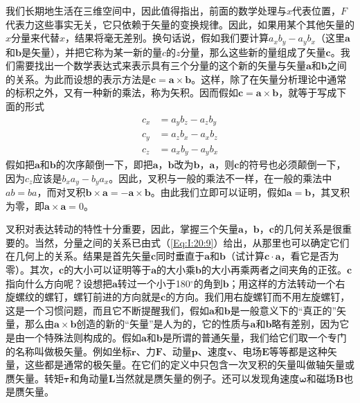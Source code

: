 我们长期地生活在三维空间中，因此值得指出，前面的数学处理与$x$代表位置，$F$代表力这些事实无关，它只依赖于矢量的变换规律。因此，如果用某个其他矢量的$x$分量来代替$x$，结果将毫无差别。换句话说，假如我们要计算$a_xb_y-a_yb_x$（这里$\boldsymbol{a}$和$\boldsymbol{b}$是矢量），并把它称为某一新的量$c$的$z$分量，那么这些新的量组成了矢量$\boldsymbol{c}$。我们需要找出一个数学表达式来表示具有三个分量的这个新的矢量与矢量$\boldsymbol{a}$和$\boldsymbol{b}$之间的关系。为此而设想的表示方法是$\boldsymbol{c}=\boldsymbol{a} \times \boldsymbol{b}$。这样，除了在矢量分析理论中通常的标积之外，又有一种新的乘法，称为矢积。因而假如$\boldsymbol{c}=\boldsymbol{a} \times \boldsymbol{b}$，就等于写成下面的形式
\begin{equation}
    \label{Eq:I:20:9}
    \begin{aligned}
        c_x &= a_yb_z - a_zb_y \\
        c_y &= a_zb_x - a_xb_z \\
        c_z &= a_xb_y - a_yb_x
    \end{aligned}
\end{equation}
假如把$\boldsymbol{a}$和$\boldsymbol{b}$的次序颠倒一下，即把$\boldsymbol{a}$，$\boldsymbol{b}$改为$\boldsymbol{b}$，$\boldsymbol{a}$，则$\boldsymbol{c}$的符号也必须颠倒一下，因为$c_z$应该是$b_xa_y-b_ya_x$。因此，叉积与一般的乘法不一样，在一般的乘法中$ab=ba$，而对叉积$\boldsymbol{b} \times \boldsymbol{a}=-\boldsymbol{a} \times \boldsymbol{b}$。由此我们立即可以证明，假如$\boldsymbol{a}=\boldsymbol{b}$，其叉积为零，即$\boldsymbol{a} \times \boldsymbol{a}=0$。

叉积对表达转动的特性十分重要，因此，掌握三个矢量$\boldsymbol{a}$，$\boldsymbol{b}$，$\boldsymbol{c}$的几何关系是很重要的。当然，分量之间的关系已由式（\ref{Eq:I:20:9}）给出，从那里也可以确定它们在几何上的关系。结果是首先矢量$\boldsymbol{c}$同时垂直于$\boldsymbol{a}$和$\boldsymbol{b}$（试计算$\boldsymbol{c} \cdot \boldsymbol{a}$，看它是否为零）。其次，$\boldsymbol{c}$的大小可以证明等于$\boldsymbol{a}$的大小乘$\boldsymbol{b}$的大小再乘两者之间夹角的正弦。$\boldsymbol{c}$指向什么方向呢？设想把$\boldsymbol{a}$转过一个小于180$^\circ$的角到$\boldsymbol{b}$；用这样的方法转动一个右旋螺纹的螺钉，螺钉前进的方向就是$\boldsymbol{c}$的方向。我们用右旋螺钉而不用左旋螺钉，这是一个习惯问题，而且它不断提醒我们，假如$\boldsymbol{a}$和$\boldsymbol{b}$是一般意义下的“真正的”矢量，那么由$\boldsymbol{a} \times \boldsymbol{b}$创造的新的“矢量”是人为的，它的性质与$\boldsymbol{a}$和$\boldsymbol{b}$略有差别，因为它是由一个特殊法则构成的。假如$\boldsymbol{a}$和$\boldsymbol{b}$是所谓的普通矢量，我们给它们取一个专门的名称叫做极矢量。例如坐标$\boldsymbol{r}$、力$\boldsymbol{F}$、动量$\boldsymbol{p}$、速度$\boldsymbol{v}$、电场$\boldsymbol{E}$等等都是这种矢量，这些都是通常的极矢量。在它们的定义中只包含一次叉积的矢量叫做轴矢量或赝矢量。转矩$\boldsymbol{\tau}$和角动量$\boldsymbol{L}$当然就是赝矢量的例子。还可以发现角速度$\boldsymbol{\omega}$和磁场$\boldsymbol{B}$也是赝矢量。

